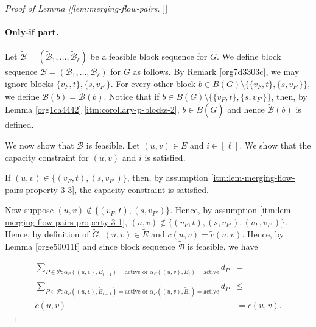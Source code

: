 \documentclass[fontsize=11pt,paper=a4]{book}
\begin{document}
\begin{proof}[Proof of Lemma [[lem:merging-flow-pairs]]]
\paragraph{Only-if part.}
Let \(\tilde{\mathcal{B}}=(\tilde{\mathscr{B}}_1,\dots,\tilde{\mathscr{B}}_{\ell})\) be a feasible block sequence for \(\tilde{G}\).
We define block sequence \(\mathcal{B}=(\mathscr{B}_1,\dots,\mathscr{B}_{\ell})\) for \(G\) as follows.
By Remark \ref{org7d3303c}, we may ignore blocks \(\{v_F,t\},\{s,v_{F'}\}\).
For every other block \(b\in B(G)\setminus\{\{v_F,t\},\{s,v_{F'}\}\}\), we define \(\mathcal{B}(b)=\tilde{\mathcal{B}}(b)\).
Notice that if \(b\in B(G)\setminus\{\{v_F,t\},\{s,v_{F'}\}\}\), then, by Lemma \ref{org1ca4442} \ref{itm:corollary-p-blocks-2}, \(b\in\tilde{B}(\tilde{G})\) and hence \(\tilde{\mathcal{B}}(b)\) is defined.

We now show that \(\mathcal{B}\) is feasible.
Let \((u,v)\in E\) and \(i\in[\ell]\).
We show that the capacity constraint for \((u,v)\) and \(i\) is satisfied.

If \((u,v)\in\{(v_F,t),(s,v_{F'})\}\), then, by assumption \ref{itm:lem-merging-flow-pairs-property-3-3}, the capacity constraint is satisfied.

Now suppose \((u,v)\notin\{(v_F,t),(s,v_{F'})\}\).
Hence, by assumption \ref{itm:lem-merging-flow-pairs-property-3-1}, \((u,v)\notin\{(v_F,t),(s,v_{F'}),(v_F,v_{F'})\}\).
Hence, by definition of \(\tilde{G}\), \((u,v)\in\tilde{E}\) and \(c(u,v)=\tilde{c}(u,v)\).
Hence, by Lemma \ref{orge50011f} and since block sequence \(\tilde{\mathcal{B}}\) is feasible, we have

\begin{align*}
\sum_{P\in\mathcal{P}:\alpha_P((u,v),B_{i-1})=\mathrm{active}\text{ or }\alpha_P((u,v),B_i)=\mathrm{active}}d_P&=\\
\sum_{P\in\tilde{\mathcal{P}}:\tilde{\alpha}_P((u,v),\tilde{B}_{i-1})=\mathrm{active}\text{ or }\tilde{\alpha}_P((u,v),\tilde{B}_i)=\mathrm{active}}\tilde{d}_P&\leq\\
\tilde{c}(u,v)&=
c(u,v).
\end{align*}
\end{proof}
\end{document}
